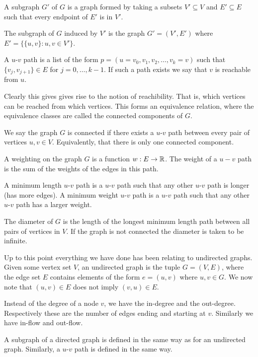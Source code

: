 \documentclass[10pt]{article}
\begin{document}
A subgraph \( G' \) of \( G \) is a graph formed by taking a subsets \( V' \subseteq V \) and \( E'\subseteq E \) such that every endpoint of \( E' \) is in \( V' \).

The subgraph of \( G \) induced by \( V' \) is the graph \( G' = (V',E') \) where \( E' = \{ \{u,v\} : u,v\in V' \} \).

A \( u \)-\( v \) path is a list of the form \( p = (u=v_0,v_1,v_2,\ldots, v_k=v) \) such that \( \{v_j,v_{j+1}\}\in E \) for \( j=0,\ldots, k-1 \). If such a path exists we say that \( v \) is reachable from \( u \).

Clearly this gives gives rise to the notion of reachibility. That is, which vertices can be reached from which vertices. This forms an equivalence relation, where the equivalence classes are called the connected components of \( G \).

We say the graph \( G \) is connected if there exists a \( u \)-\( v \) path between every pair of vertices \( u,v\in V \). Equivalently, that there is only one connected component.

A weighting on the graph \( G \) is a function \( w:E\to \mathbb{R} \). The weight of a \( u-v \) path is the sum of the weights of the edges in this path.

A minimum length  \( u \)-\( v \) path is a \( u \)-\( v \) path such that any other \( u \)-\( v \) path is longer (has more edges). A minimum weight \( u \)-\( v \) path is a \( u \)-\( v \) path such that any other \( u \)-\( v \) path has a larger weight.

The diameter of \( G \) is the length of the longest minimum length path between all pairs of vertices in \( V \). If the graph is not connected the diameter is taken to be infinite.

Up to this point everything we have done has been relating to undirected graphs. Given some vertex set \( V \), an undirected graph is the tuple \( G = (V,E) \), where the edge set \( E \) contains elements of the form \( e=(u,v) \) where \( u,v\in G \). We now note that \( (u,v)\in E \) does not imply \( (v,u)\in E \).

Instead of the degree of a node \( v \), we have the in-degree and the out-degree. Respectively these are the number of edges ending and starting at \( v \). Similarly we have in-flow and out-flow.

A subgraph of a directed graph is defined in the same way as for an undirected graph. Similarly, a \( u \)-\( v \) path is defined in the same way.
\end{document}
